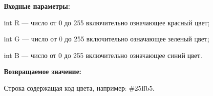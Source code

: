 \textbf{Входные параметры:}

int R --- число от 0 до 255 включительно означающее красный цвет;
 
    int G --- число от 0 до 255 включительно означающее зеленый цвет;
 
    int B --- число от 0 до 255 включительно означающее синий цвет.

\textbf{Возвращаемое значение:}

Строка содержащая код цвета, например: \#25ffb5.